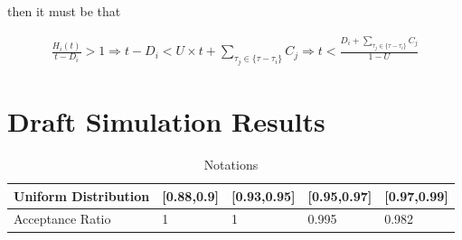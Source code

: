 \documentclass[12pt,conference,onecolumn]{IEEEtran}
\begin{document}
then it must be that

\begin{align*}
\frac{H_i(t)}{t-D_i}>1\Rightarrow t-D_i< U\times t+\sum_{\tau_j\in\{\tau-\tau_i\}}C_j\Rightarrow t<\frac{D_i+\sum_{\tau_j\in\{\tau-\tau_i\}}C_j}{1-U}
\end{align*}

\section{Draft Simulation Results}

\begin{table}[h]
\caption{Notations}
\label{tab:x}
\large
\center
\begin{tabular}{|l|l|l|l|l|}
 \hline
Uniform Distribution&[0.88,0.9]&[0.93,0.95]&[0.95,0.97]&[0.97,0.99]\\
 \hline
Acceptance Ratio&1&1&0.995&0.982\\
 \hline
\end{tabular}
\end{table}
\end{document}
